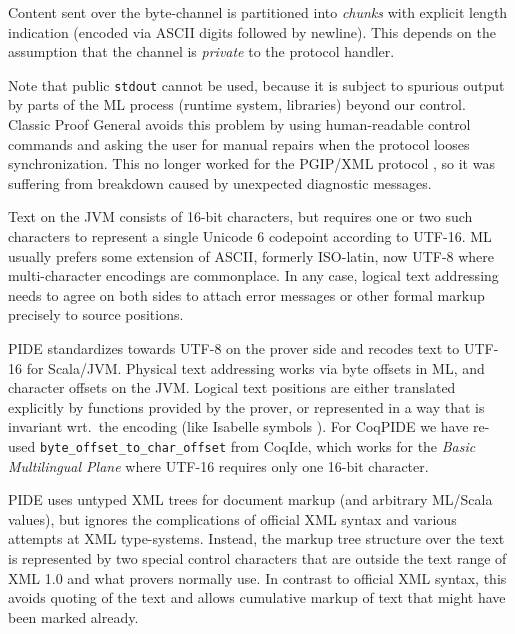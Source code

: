 \begin{isabellebody}
\begin{isamarkuptext}
  Content sent over the byte-channel is partitioned into \emph{chunks}
  with explicit length indication (encoded via ASCII digits followed
  by newline).  This depends on the assumption that the channel is
  \emph{private} to the protocol handler.

  Note that public \texttt{stdout} cannot be used, because it is
  subject to spurious output by parts of the ML process (runtime
  system, libraries) beyond our control.  Classic Proof General
  \cite{Aspinall:TACAS:2000} avoids this problem by using
  human-readable control commands and asking the user for manual
  repairs when the protocol looses synchronization.  This no longer
  worked for the PGIP/XML protocol \cite{Aspinall-et-al:2007}, so it
  was suffering from breakdown caused by unexpected diagnostic
  messages.

   Text on the JVM
  consists of 16-bit characters, but requires one or two such
  characters to represent a single Unicode 6 codepoint according to
  UTF-16.  ML usually prefers some extension of ASCII, formerly
  ISO-latin, now UTF-8 where multi-character encodings are
  commonplace.  In any case, logical text addressing needs to agree on
  both sides to attach error messages or other formal markup precisely
  to source positions.

  PIDE standardizes towards UTF-8 on the prover side and recodes text
  to UTF-16 for Scala/JVM.  Physical text addressing works via byte
  offsets in ML, and character offsets on the JVM.  Logical text
  positions are either translated explicitly by functions provided by
  the prover, or represented in a way that is invariant wrt.\ the
  encoding (like Isabelle symbols \cite[\S2.1]{Wenzel:2011:CICM}).
  For CoqPIDE we have re-used \verb,byte_offset_to_char_offset, from
  CoqIde, which works for the \emph{Basic Multilingual Plane} where
  UTF-16 requires only one 16-bit character.

   PIDE uses untyped XML
  trees for document markup (and arbitrary ML/Scala values), but
  ignores the complications of official XML syntax and various
  attempts at XML type-systems.  Instead, the markup tree structure
  over the text is represented by two special control characters that
  are outside the text range of XML 1.0 and what provers normally use.
  In contrast to official XML syntax, this avoids quoting of the text
  and allows cumulative markup of text that might have been marked
  already.


\end{isamarkuptext}
\end{isabellebody}
